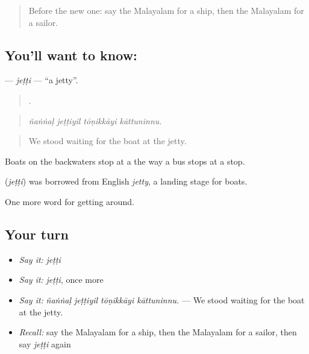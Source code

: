 \label{lesson:ML-C475-jetti}



\begin{quote}
Before the new one: say the Malayalam for a ship, then the Malayalam for a sailor.
\end{quote}

\subsection*{You'll want to know: }
\textbf{} — \emph{jeṭṭi} — \textquotedblleft{}a jetty\textquotedblright{}.

\begin{quote}
   .
\end{quote}

\begin{quote}
\emph{ñaṅṅaḷ jeṭṭiyil tōṇikkāyi kāttuninnu.}
\end{quote}

\begin{quote}
We stood waiting for the boat at the jetty.
\end{quote}

Boats on the backwaters stop at a  the way a bus stops at a stop.

\begin{cousinweb}
\textbf{} (\emph{jeṭṭi}) was borrowed from English \emph{jetty}, a landing stage for boats.
\end{cousinweb}

\begin{grammarlens}[title={What you've built}]
One more word for getting around.
\end{grammarlens}

\subsection*{Your turn}
\begin{itemize}
\raggedright
  \item \emph{Say it:} \emph{jeṭṭi}
  \item \emph{Say it:} \emph{jeṭṭi}, once more
  \item \emph{Say it:} \emph{ñaṅṅaḷ jeṭṭiyil tōṇikkāyi kāttuninnu.} — We stood waiting for the boat at the jetty.
  \item \emph{Recall:} say the Malayalam for a ship, then the Malayalam for a sailor, then say \emph{jeṭṭi} again
\end{itemize}

